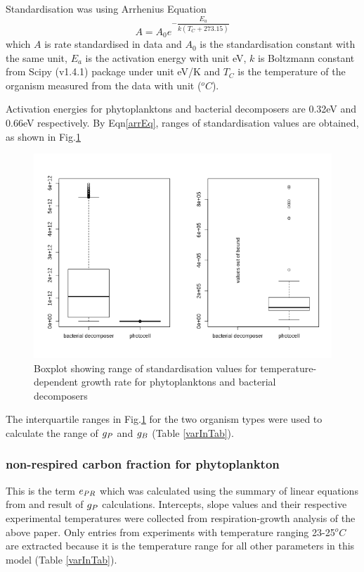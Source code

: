 \documentclass[../thesis.tex]{subfiles} %
\begin{document}
Standardisation was using Arrhenius Equation
\begin{equation}
    A = A_0e^{-\dfrac{E_a}{k(T_C+273.15)}}
    \label{arrEq}
\end{equation}
which $A$ is rate standardised in data and $A_0$ is the standardisation constant with the same unit, $E_a$ is the activation energy with unit eV, $k$ is Boltzmann constant from Scipy (v1.4.1) package under unit eV/K and $T_C$ is the temperature of the organism measured from the data with unit ($^oC$).

Activation energies for phytoplanktons and bacterial decomposers are 0.32eV and 0.66eV respectively.\autocite{regaudie2012temperature}  By Eqn\ref{arrEq}, ranges of standardisation values are obtained, as shown in Fig.\ref{growStdVal}

\begin{figure}[H]
    \centering
    \includegraphics[width=.8\linewidth]{result/stdCst.png}
    \caption[Boxplot of standardisation growth rates]{Boxplot showing range of standardisation values for temperature-dependent growth rate for phytoplanktons and bacterial decomposers}
    \label{growStdVal}
\end{figure}

The interquartile ranges in Fig.\ref{growStdVal} for the two organism types were used to calculate the range of $g_P$ and $g_B$ (Table \ref{varInTab}).

\subsubsection{non-respired carbon fraction for phytoplankton}
This is the term $e_{PR}$ which was calculated using the summary of linear equations from \autocite{j1989respiration} and result of $g_P$ calculations.  Intercepts, slope values and their respective experimental temperatures were collected from respiration-growth analysis of the above paper.  Only entries from experiments with temperature ranging 23-25$^oC$ are extracted because it is the temperature range for all other parameters in this model (Table \ref{varInTab}).
\end{document}
